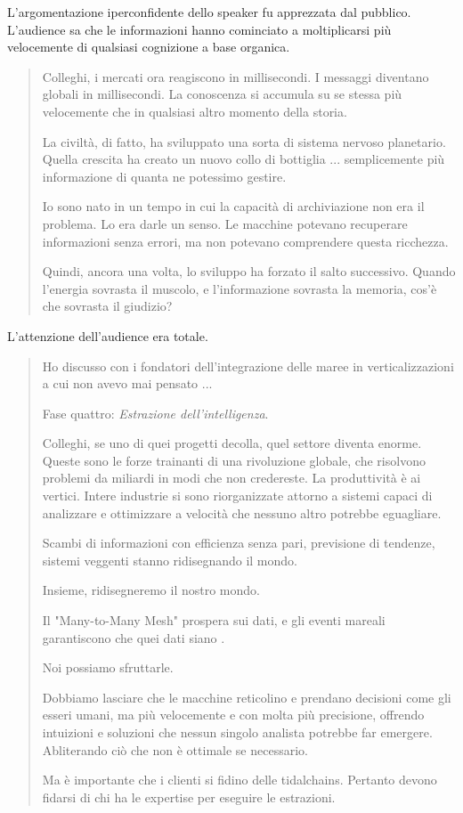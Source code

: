 L'argomentazione iperconfidente dello speaker fu apprezzata dal pubblico. L'audience sa che le informazioni hanno cominciato a moltiplicarsi più velocemente di qualsiasi cognizione a base organica.

\begin{quote}
Colleghi, i mercati ora reagiscono in millisecondi. I messaggi diventano globali in millisecondi. La conoscenza si accumula su se stessa più velocemente che in qualsiasi altro momento della storia. 

\medskip

La civiltà, di fatto, ha sviluppato una sorta di sistema nervoso planetario. Quella crescita ha creato un nuovo collo di bottiglia ... semplicemente più informazione di quanta ne potessimo gestire.

\medskip

Io sono nato in un tempo in cui la capacità di archiviazione non era il problema. Lo era darle un senso. Le macchine potevano recuperare informazioni senza errori, ma non potevano comprendere questa ricchezza. 

\medskip

Quindi, ancora una volta, lo sviluppo ha forzato il salto successivo. Quando l'energia sovrasta il muscolo, e l'informazione sovrasta la memoria, cos'è che sovrasta il giudizio?
\end{quote}

L'attenzione dell'audience era totale.

\begin{quote}
Ho discusso con i fondatori dell'integrazione delle maree in verticalizzazioni a cui non avevo mai pensato ...

Fase quattro: \textit{Estrazione dell'intelligenza}.

Colleghi, se uno di quei progetti decolla, quel settore diventa enorme. Queste sono le forze trainanti di una rivoluzione globale, che risolvono problemi da miliardi in modi che non credereste. La produttività è ai vertici. Intere industrie si sono riorganizzate attorno a sistemi capaci di analizzare e ottimizzare a velocità che nessuno altro potrebbe eguagliare.

Scambi di informazioni con efficienza senza pari, previsione di tendenze, sistemi veggenti stanno ridisegnando il mondo. 

Insieme, ridisegneremo il nostro mondo.

Il "Many-to-Many Mesh"  prospera sui dati, e gli eventi mareali garantiscono che quei dati siano .

Noi possiamo sfruttarle. 

Dobbiamo lasciare che le macchine reticolino e prendano decisioni come gli esseri umani, ma più velocemente e con molta più precisione, offrendo intuizioni e soluzioni che nessun singolo analista potrebbe far emergere. Abliterando ciò che non è ottimale se necessario.

Ma è importante che i clienti si fidino delle tidalchains. Pertanto devono fidarsi di chi ha le expertise per eseguire le estrazioni.
\end{quote}

